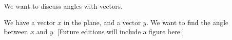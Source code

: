 
We want to discuss angles with vectors.

We have a vector $x$ in the plane, and a vector $y$.
We want to find the angle between $x$ and $y$.
[Future editions will include a figure here.]


\blankpage
